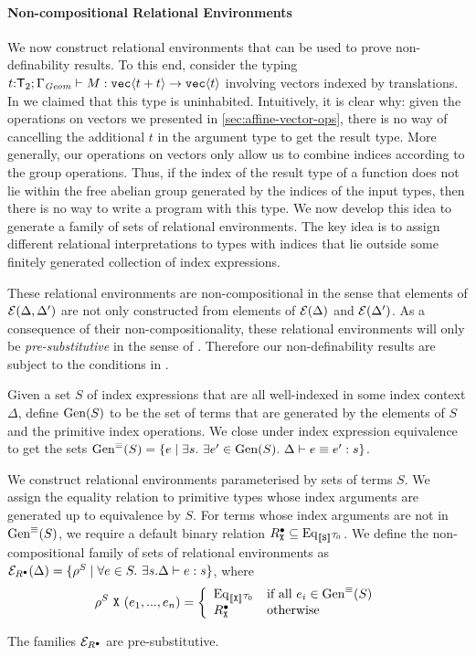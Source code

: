 \paragraph{Non-compositional Relational Environments}
We now construct relational environments that can be used to prove
non-definability results. To this end, consider the typing
$t\mathord:\mathsf{T}_2; \Gamma_{\mathit{Geom}} \vdash M : \textup{\texttt{vec}}\langle t +
  t \rangle \to \textup{\texttt{vec}}\langle t \rangle$ involving vectors indexed by translations.
In  we claimed that this type is
uninhabited. Intuitively, it is clear why: given the operations on
vectors we presented in \autoref{sec:affine-vector-ops}, there is no
way of cancelling the additional $t$ in the argument type to get the
result type. More generally, our operations on vectors only allow us
to combine indices according to the group operations. Thus, if the
index of the result type of a function does not lie within the free
abelian group generated by the indices of the input types, then there
is no way to write a program with this %
type. We now develop this idea to generate a family of sets of
relational environments. The key idea is to assign different
relational interpretations to types with indices that lie outside some
finitely generated collection of index expressions.

These relational environments are non-compositional in the sense that
elements of $\mathcal{E}(\Delta,\Delta')$ are not only constructed from
elements of $\mathcal{E}(\Delta)$ and $\mathcal{E}(\Delta')$. As a
consequence of their non-compositionality, these relational
environments will only be \emph{pre-substitutive} in the sense of
. Therefore our non-definability
results are subject to the conditions in .

Given a set $S$ of index expressions that are all well-indexed in some
index context $\Delta$, define $\mathrm{Gen}(S)$ to be the set of terms that
are generated by the elements of $S$ and the primitive index
operations. We close under index expression equivalence to get the
sets $\mathrm{Gen}^\equiv(S) = \{ e \mathrel| \exists s.\ \exists e' \in
\mathrm{Gen}(S).\ \Delta \vdash e \equiv e' : s \}$.

We construct relational environments parameterised by sets of terms
$S$. We assign the equality relation to primitive types whose index
arguments are generated up to equivalence by $S$. For terms whose
index arguments are not in $\mathrm{Gen}^\equiv(S)$, we require a default
binary relation $R^\bullet_{\textup{\texttt{X}}} \subseteq
\mathrm{Eq}_{\llbracket \textup{\texttt{S}} \rrbracket^{\mathcal{T}_0}}$. We define the non-compositional
family of sets of relational environments as
$\mathcal{E}_{R^\bullet}(\Delta) = \{ \rho^S \mathrel| \forall e \in S.\
\exists s. \Delta \vdash e : s \}$, where
\begin{displaymath}
  \rho^S\ \textup{\texttt{X}}\ (e_1,...,e_n) = \left\{
    \begin{array}{ll}
      \mathrm{Eq}_{\llbracket \textup{\texttt{X}} \rrbracket^{\mathcal{T}_0}} & \textrm{if all}\ e_i \in \mathrm{Gen}^\equiv(S) \\
      R^\bullet_{\textup{\texttt{X}}} & \textrm{otherwise}
    \end{array}
  \right.
\end{displaymath}

\begin{theorem}
  The families $\mathcal{E}_{R^\bullet}$ are pre-substitutive.
\end{theorem}


